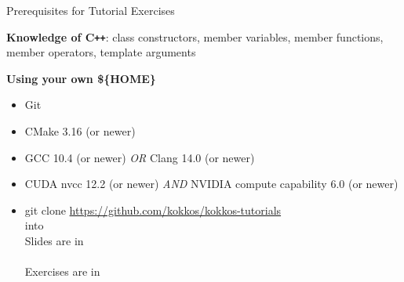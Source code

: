 




\begin{frame}{Prerequisites for Tutorial Exercises}

\textbf{Knowledge of C\texttt{++}}:
  class constructors, member variables, member functions, member operators, template arguments

\vspace{10pt}


\vspace{10pt}

\textbf{Using your own {\$\{HOME\}}}
\begin{scriptsize}
  \begin{itemize}
  \item {Git}
  \item {CMake 3.16 (or newer)}
  \item {GCC 10.4 (or newer)}
    \textit{OR} {Clang 14.0 (or newer)}
  \item {CUDA nvcc 12.2 (or newer)}
    \textit{AND} {NVIDIA compute capability 6.0 (or newer)}
  \item {git clone \url{https://github.com/kokkos/kokkos-tutorials} \\ \hspace{2pt}  into }
        \\ \vspace{4pt} \hspace{2pt} Slides are in \\ \hspace{8pt} 
        \\ \vspace{4pt} \hspace{2pt} Exercises are in \\ \hspace{8pt} 
  \end{itemize}
\end{scriptsize}

\end{frame}


